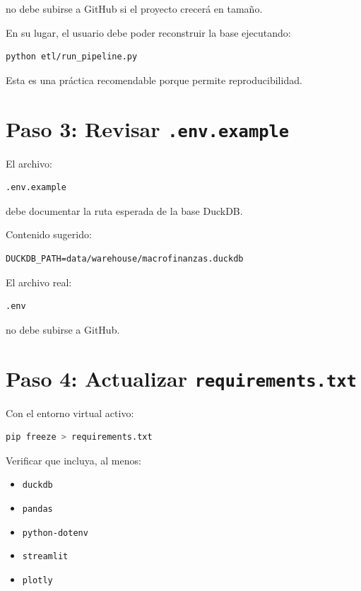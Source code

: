no debe subirse a GitHub si el proyecto crecerá en tamaño.

En su lugar, el usuario debe poder reconstruir la base ejecutando:

\begin{lstlisting}[language=bash]
python etl/run_pipeline.py
\end{lstlisting}

Esta es una práctica recomendable porque permite reproducibilidad.

\section{Paso 3: Revisar \texttt{.env.example}}

El archivo:

\begin{verbatim}
.env.example
\end{verbatim}

debe documentar la ruta esperada de la base DuckDB.

Contenido sugerido:

\begin{lstlisting}
DUCKDB_PATH=data/warehouse/macrofinanzas.duckdb
\end{lstlisting}

El archivo real:

\begin{verbatim}
.env
\end{verbatim}

no debe subirse a GitHub.

\section{Paso 4: Actualizar \texttt{requirements.txt}}

Con el entorno virtual activo:

\begin{lstlisting}[language=bash]
pip freeze > requirements.txt
\end{lstlisting}

Verificar que incluya, al menos:

\begin{itemize}
\item \texttt{duckdb}
\item \texttt{pandas}
\item \texttt{python-dotenv}
\item \texttt{streamlit}
\item \texttt{plotly}
\end{itemize}

